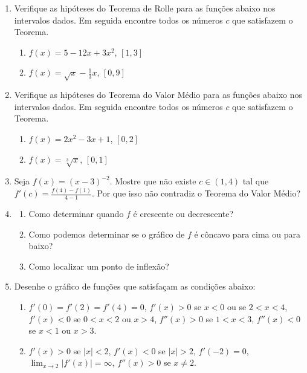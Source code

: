 \documentclass[a4paper,5pt]{amsbook}
\newcommand{\ds}{\displaystyle}
\newcommand{\ra}{\rightarrow}
\begin{document}
\vspace{1cm}
\begin{enumerate}
    \vspace{0.5cm}
    \item Verifique as hip\'oteses do Teorema de Rolle para as fun\c{c}\~oes abaixo
        nos intervalos dados. Em seguida encontre todos os n\'umeros $c$ que
        satisfazem o Teorema.
        \begin{enumerate}
            \item $f(x)=5-12x+3x^2$, $[1,3]$
            \item $f(x)=\sqrt{x}-\ds\frac{1}{3}x$, $[0,9]$
        \end{enumerate}

    \vspace{0.5cm}
    \item Verifique as hip\'oteses do Teorema do Valor M\'edio para as
        fun\c{c}\~oes abaixo nos intervalos dados. Em seguida encontre todos os n\'umeros $c$
        que satisfazem o Teorema.
        \begin{enumerate}
            \item $f(x) = 2x^2-3x+1$, $[0,2]$
            \item $f(x) = \sqrt[3]{x}$, $[0,1]$
        \end{enumerate}

    \vspace{0.5cm}
    \item Seja $f(x) = {(x-3)}^{-2}$. Mostre que n\~ao existe $c\in(1,4)$ tal
        que $f'(c) = \ds\frac{f(4)-f(1)}{4-1}$. Por que isso n\~ao contradiz o Teorema
        do Valor M\'edio?

    \vspace{0.5cm}
    \item
        \begin{enumerate}
            \item Como determinar quando $f$ \'e crescente ou decrescente?
            \item Como podemos determinar se o gr\'afico de $f$ \'e c\^oncavo para
                cima ou para baixo?
            \item Como localizar um ponto de inflex\~ao?
        \end{enumerate}

    \vspace{0.5cm}
    \item Desenhe o gr\'afico de fun\c{c}\~oes que satisfa\c{c}am as condi\c{c}\~oes abaixo:
        \begin{enumerate}
            \item $f'(0)=f'(2)=f'(4)=0$, $f'(x)>0$ se $x<0$ ou se $2<x<4$,
                $f'(x)<0$ se $0<x<2$ ou $x>4$, $f''(x)>0$ se $1<x<3$,
                $f''(x)<0$ se $x<1$ ou $x>3$.
            \item $f'(x)>0$ se $|x|<2$, $f'(x)<0$ se $|x|>2$, $f'(-2)=0$,
                $\ds\lim_{x\ra2}|f'(x)|=\infty$, $f''(x)>0$ se $x\neq2$.
        \end{enumerate}


\end{enumerate}
\end{document}
